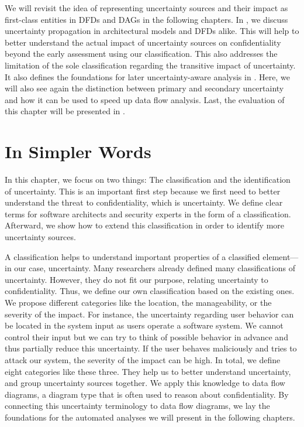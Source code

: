 We will revisit the idea of representing uncertainty sources and their impact as first-class entities in \acp{DFD} and \acp{DAG} in the following chapters.
In , we discuss uncertainty propagation in architectural models and \acp{DFD} alike.
This will help to better understand the actual impact of uncertainty sources on confidentiality beyond the early assessment using our classification.
This also addresses the limitation of the sole classification regarding the transitive impact of uncertainty.
It also defines the foundations for later uncertainty-aware analysis in .
Here, we will also see again the distinction between primary and secondary uncertainty and how it can be used to speed up data flow analysis.
Last, the evaluation of this chapter will be presented in .





\section{In Simpler Words}%
\label{sec:classification:simple}

In this chapter, we focus on two things: The classification and the identification of uncertainty.
This is an important first step because we first need to better understand the threat to confidentiality, which is uncertainty.
We define clear terms for software architects and security experts in the form of a classification.
Afterward, we show how to extend this classification in order to identify more uncertainty sources.

A classification helps to understand important properties of a classified element---in our case, uncertainty.
Many researchers already defined many classifications of uncertainty.
However, they do not fit our purpose, relating uncertainty to confidentiality.
Thus, we define our own classification based on the existing ones.
We propose different categories like the location, the manageability, or the severity of the impact.
For instance, the uncertainty regarding user behavior can be located in the system input as users operate a software system.
We cannot control their input but we can try to think of possible behavior in advance and thus partially reduce this uncertainty.
If the user behaves maliciously and tries to attack our system, the severity of the impact can be high.
In total, we define eight categories like these three.
They help us to better understand uncertainty, and group uncertainty sources together.
We apply this knowledge to data flow diagrams, a diagram type that is often used to reason about confidentiality.
By connecting this uncertainty terminology to data flow diagrams, we lay the foundations for the automated analyses we will present in the following chapters.

